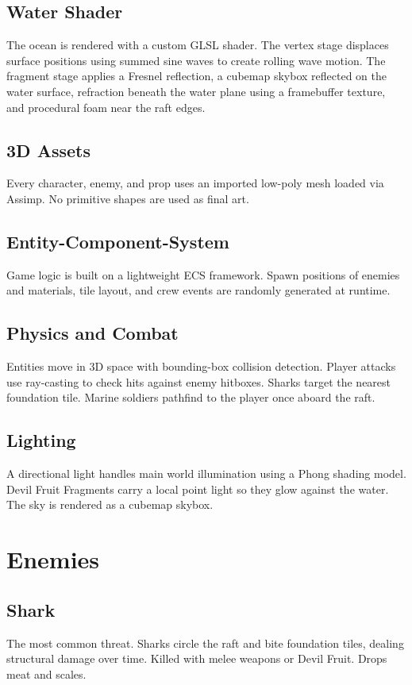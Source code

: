\documentclass[12pt, a4paper]{article}
\begin{document}
\subsection{Water Shader}
The ocean is rendered with a custom GLSL shader. The vertex stage displaces surface positions using summed
sine waves to create rolling wave motion. The fragment stage applies a Fresnel reflection, a cubemap skybox
reflected on the water surface, refraction beneath the water plane using a framebuffer texture, and
procedural foam near the raft edges.

\subsection{3D Assets}
Every character, enemy, and prop uses an imported low-poly mesh loaded via Assimp. No primitive shapes
are used as final art.

\subsection{Entity-Component-System}
Game logic is built on a lightweight ECS framework. Spawn positions of enemies and materials, tile layout,
and crew events are randomly generated at runtime.

\subsection{Physics and Combat}
Entities move in 3D space with bounding-box collision detection. Player attacks use ray-casting to check hits
against enemy hitboxes. Sharks target the nearest foundation tile. Marine soldiers pathfind to the player once
aboard the raft.

\subsection{Lighting}
A directional light handles main world illumination using a Phong shading model. Devil Fruit Fragments carry
a local point light so they glow against the water. The sky is rendered as a cubemap skybox.

\section{Enemies}

\subsection{Shark}
The most common threat. Sharks circle the raft and bite foundation tiles, dealing structural damage over time.
Killed with melee weapons or Devil Fruit. Drops meat and scales.
\end{document}
